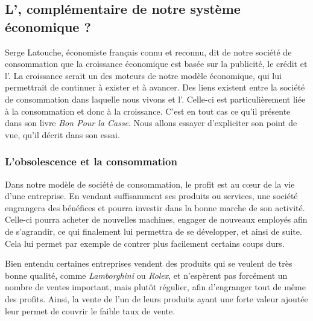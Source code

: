 \subsection{L'\op, complémentaire de notre système\\ économique ?}

Serge Latouche, économiste français connu et reconnu, dit de notre société de consommation que la croissance économique est basée sur la publicité, le crédit et l'\op. La croissance serait un des moteurs de notre modèle économique, qui lui permettrait de continuer à exister et à avancer. Des liens existent entre la société de consommation dans laquelle nous vivons et l'\op. Celle-ci est particulièrement liée à la consommation et donc à la croissance. C'est en tout cas ce qu'il présente dans son livre \textit{Bon Pour la Casse}. Nous allons essayer d'expliciter son point de vue, qu'il décrit dans son essai.


\subsubsection{L'obsolescence et la consommation}
Dans notre modèle de société de consommation, le profit est au cœur de la vie d'une entreprise. En vendant suffisamment ses produits ou services, une société engrangera des bénéfices et pourra investir dans la bonne marche de son activité. Celle-ci pourra acheter de nouvelles machines, engager de nouveaux employés afin de s'agrandir, ce qui finalement lui permettra de se développer, et ainsi de suite. Cela lui permet par exemple de contrer plus facilement certains coups durs.

Bien entendu certaines entreprises vendent des produits qui se veulent de très bonne qualité, comme \textit{Lamborghini} ou \textit{Rolex}, et n'espèrent pas forcément un nombre de ventes important, mais plutôt régulier, afin d'engranger tout de même des profits. Ainsi, la vente de l'un de leurs produits ayant une forte valeur ajoutée leur permet de couvrir le faible taux de vente.


